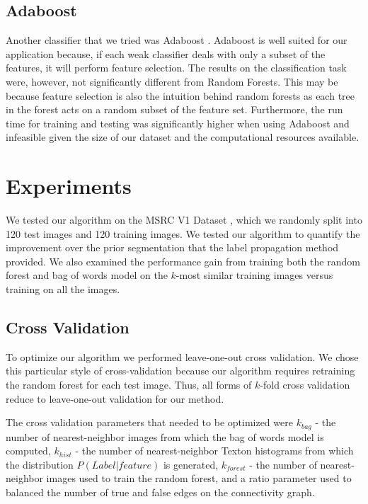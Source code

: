 \documentclass{article} %
\begin{document}
\subsection{Adaboost}
Another classifier that we tried was Adaboost \cite{Freund96experimentswith}. Adaboost is well suited for our application because, if each weak classifier deals with only a subset of the features, it will perform feature selection. The results on the classification task were, however, not significantly different from Random Forests. This may be because feature selection is also the intuition behind random forests as each tree in the forest acts on a random subset of the feature set. Furthermore, the run time for training and testing was significantly higher when using Adaboost and infeasible given the size of our dataset and the computational resources available.


\section{Experiments}
\label{sec:Exp}

We tested our algorithm on the MSRC V1 Dataset \cite{MSRC}, which we randomly split into 120 test images and 120 training images.
We tested our algorithm to quantify the improvement over the prior segmentation that the label propagation method provided. We also examined the performance gain from training both the random forest and bag of words model on the $k$-most similar training images versus training on all the images.

\subsection{Cross Validation}
\label{sec:cross}

To optimize our algorithm we performed leave-one-out cross validation. We chose this particular style of cross-validation because our algorithm requires retraining the random forest for each test image. Thus, all forms of $k$-fold cross validation reduce to leave-one-out validation for our method.

The cross validation parameters that needed to be optimized were $k_{bag}$ - the number of nearest-neighbor images from which the bag of words model is computed, $k_{hist}$ - the number of nearest-neighbor Texton histograms from which the distribution $P(Label | feature)$ is generated, $k_{forest}$ - the number of nearest-neighbor images used to train the random forest, and a ratio parameter used to balanced the number of true and false edges on the connectivity graph. 
\end{document}
